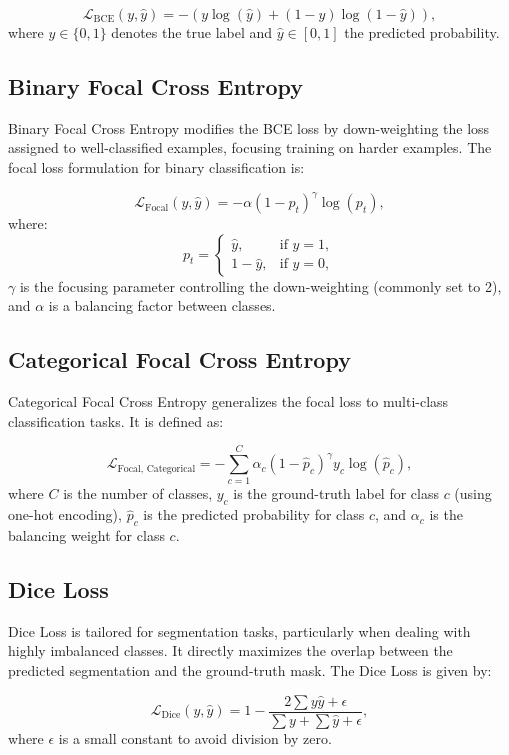\documentclass[conference]{ieeetran}
\begin{document}
\[
\mathcal{L}_{\text{BCE}}(y, \hat{y}) = -\left( y \log(\hat{y}) + (1 - y) \log(1 - \hat{y}) \right),
\]
where \( y \in \{0, 1\} \) denotes the true label and \( \hat{y} \in [0, 1] \) the predicted probability.


\subsection{Binary Focal Cross Entropy}

Binary Focal Cross Entropy modifies the BCE loss by down-weighting the loss assigned to well-classified examples, focusing training on harder examples. The focal loss formulation for binary classification is:

\[
\mathcal{L}_{\text{Focal}}(y, \hat{y}) = -\alpha (1 - p_t)^\gamma \log(p_t),
\]
where:
\[
p_t = 
\begin{cases}
\hat{y}, & \text{if } y = 1, \\
1 - \hat{y}, & \text{if } y = 0,
\end{cases}
\]
\(\gamma\) is the focusing parameter controlling the down-weighting (commonly set to 2), and \(\alpha\) is a balancing factor between classes.


\subsection{Categorical Focal Cross Entropy}

Categorical Focal Cross Entropy generalizes the focal loss to multi-class classification tasks. It is defined as:

\[
\mathcal{L}_{\text{Focal, Categorical}} = -\sum_{c=1}^{C} \alpha_c (1 - \hat{p}_c)^\gamma y_c \log(\hat{p}_c),
\]
where \(C\) is the number of classes, \(y_c\) is the ground-truth label for class \(c\) (using one-hot encoding), \(\hat{p}_c\) is the predicted probability for class \(c\), and \(\alpha_c\) is the balancing weight for class \(c\).


\subsection{Dice Loss}

Dice Loss is tailored for segmentation tasks, particularly when dealing with highly imbalanced classes. It directly maximizes the overlap between the predicted segmentation and the ground-truth mask. The Dice Loss is given by:

\[
\mathcal{L}_{\text{Dice}}(y, \hat{y}) = 1 - \frac{2 \sum y \hat{y} + \epsilon}{\sum y + \sum \hat{y} + \epsilon},
\]
where \(\epsilon\) is a small constant to avoid division by zero.
\end{document}
